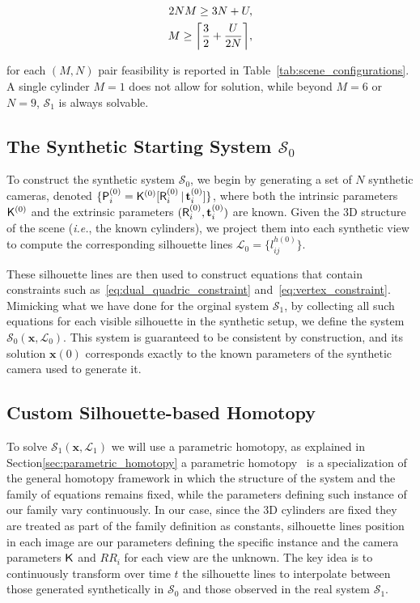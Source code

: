\begin{equation}
      \begin{aligned}
              2NM \ge 3N + U, \\
              M \ge \ceil*{\frac{3}{2} + \frac{U}{2N}},
      \end{aligned}
      \label{eq:SolvableConditionSimple}
\end{equation}

for each $(M,N)$ pair feasibility is reported in Table~\ref{tab:scene_configurations}.
A single cylinder  $M=1$ does not allow for  solution, while beyond $M=6$ or $N=9$, $\mathcal{S}_1$ is always solvable. 

\subsection{The Synthetic Starting System \texorpdfstring{$\mathcal{S}_0$}{S0}}
\label{sec:synthetic_system}

To construct the synthetic system $\mathcal{S}_0$, we begin by generating a set of $N$ synthetic cameras, denoted $\{\mathsf{P}_i^{(0)} = \mathsf{K}^{(0)}[\mathsf{R}_i^{(0)}\,|\,\mathbf{t}_i^{(0)}]\}$, where both the intrinsic parameters $\mathsf{K}^{(0)}$ and the extrinsic parameters $(\mathsf{R}_i^{(0)}, \mathbf{t}_i^{(0)})$ are known. Given the 3D structure of the scene (\emph{i.e.}, the known cylinders), we project them into each synthetic view to compute the corresponding silhouette lines $\mathcal{L}_0 = \{l^{h(0)}_{ij}\}$.

These silhouette lines are then used to construct equations that contain constraints such as~\eqref{eq:dual_quadric_constraint} and~\eqref{eq:vertex_constraint}. Mimicking what we have done for the orginal system $\mathcal{S}_1$, by collecting all such equations for each visible silhouette in the synthetic setup, we define the system $\mathcal{S}_0(\mathbf{x},\mathcal{L}_0)$. This system is guaranteed to be consistent by construction, and its solution $\mathbf{x}(0)$ corresponds exactly to the known parameters of the synthetic camera  used to generate it.


\subsection{Custom Silhouette-based Homotopy}
\label{sec:silhouette-based-homotopy}

To solve $\mathcal{S}_1(\mathbf{x},\mathcal{L}_1)$ we will use a parametric homotopy, as explained in Section\ref{sec:parametric_homotopy} a parametric homotopy~\cite{may2004parametrizedhomotopytheory} is a specialization of the general homotopy framework in which the structure of the system and the family of equations remains fixed, while the parameters defining such instance of our family vary continuously. In our case, since the 3D cylinders are fixed they are treated as part of the family definition as constants, silhouette lines position in each image are our parameters defining the specific instance and the camera parameters $\mathsf{K}$ and $RR_i$ for each view are the unknown. The key idea is to continuously transform over time $t$ the silhouette lines to interpolate between those generated synthetically in $\mathcal{S}_0$ and those observed in the real system $\mathcal{S}_1$.

